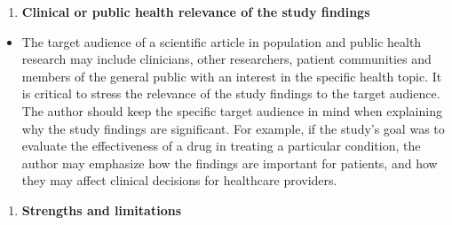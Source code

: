 \documentclass[
]{book}
\providecommand{\tightlist}{%
  \setlength{\itemsep}{0pt}\setlength{\parskip}{0pt}}
\begin{document}
\begin{enumerate}
\def\labelenumi{\arabic{enumi}.}
\setcounter{enumi}{2}
\tightlist
\item
  \textbf{Clinical or public health relevance of the study findings}
\end{enumerate}

\begin{itemize}
\tightlist
\item
  The target audience of a scientific article in population and public health research may include clinicians, other researchers, patient communities and members of the general public with an interest in the specific health topic. It is critical to stress the relevance of the study findings to the target audience. The author should keep the specific target audience in mind when explaining why the study findings are significant. For example, if the study's goal was to evaluate the effectiveness of a drug in treating a particular condition, the author may emphasize how the findings are important for patients, and how they may affect clinical decisions for healthcare providers.
\end{itemize}

\begin{enumerate}
\def\labelenumi{\arabic{enumi}.}
\setcounter{enumi}{3}
\tightlist
\item
  \textbf{Strengths and limitations}
\end{enumerate}
\end{document}
